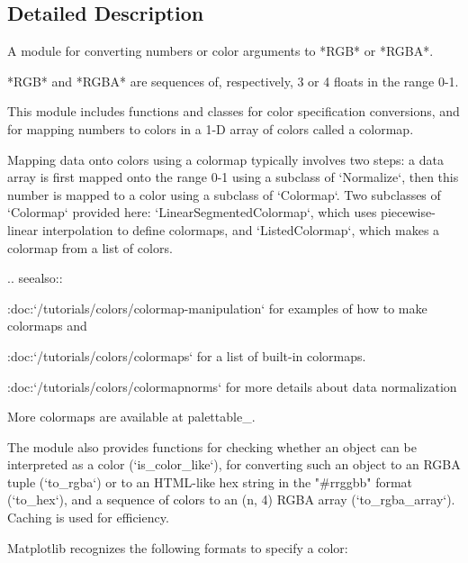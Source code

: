 \subsection{Detailed Description}
\begin{DoxyVerb}A module for converting numbers or color arguments to *RGB* or *RGBA*.

*RGB* and *RGBA* are sequences of, respectively, 3 or 4 floats in the
range 0-1.

This module includes functions and classes for color specification conversions,
and for mapping numbers to colors in a 1-D array of colors called a colormap.

Mapping data onto colors using a colormap typically involves two steps: a data
array is first mapped onto the range 0-1 using a subclass of `Normalize`,
then this number is mapped to a color using a subclass of `Colormap`.  Two
subclasses of `Colormap` provided here:  `LinearSegmentedColormap`, which uses
piecewise-linear interpolation to define colormaps, and `ListedColormap`, which
makes a colormap from a list of colors.

.. seealso::

  :doc:`/tutorials/colors/colormap-manipulation` for examples of how to
  make colormaps and

  :doc:`/tutorials/colors/colormaps` for a list of built-in colormaps.

  :doc:`/tutorials/colors/colormapnorms` for more details about data
  normalization

  More colormaps are available at palettable_.

The module also provides functions for checking whether an object can be
interpreted as a color (`is_color_like`), for converting such an object
to an RGBA tuple (`to_rgba`) or to an HTML-like hex string in the
"#rrggbb" format (`to_hex`), and a sequence of colors to an (n, 4)
RGBA array (`to_rgba_array`).  Caching is used for efficiency.

Matplotlib recognizes the following formats to specify a color:


\end{DoxyVerb}
